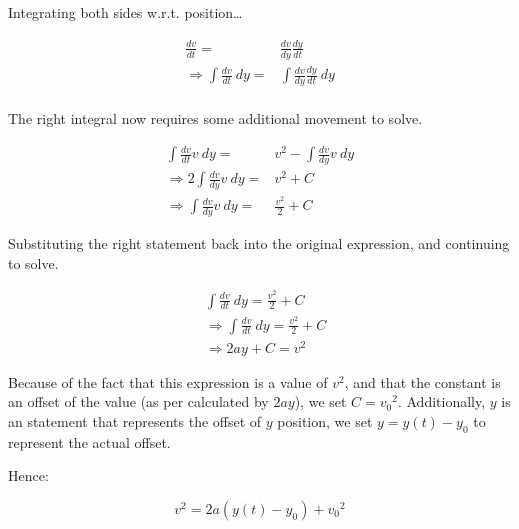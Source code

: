 \documentclass[letterpaper]{article}
\begin{document}
Integrating both sides w.r.t. position\ldots{}

\begin{align}
    \frac{dv}{dt} =& \frac{dv}{dy}\frac{dy}{dt} \\
    \Rightarrow \int \frac{dv}{dt}\ dy =& \int \frac{dv}{dy}\frac{dy}{dt}\ dy\\
\end{align}

The right integral now requires some additional movement to solve.

\begin{align}
     \int \frac{dv}{dt}v\ dy =& v^2 - \int \frac{dv}{dy} v\ dy \\
     \Rightarrow 2\int \frac{dv}{dy}v\ dy =& v^2 + C \\
     \Rightarrow \int \frac{dv}{dy}v\ dy =& \frac{v^2}{2} + C
\end{align}

Substituting the right statement back into the original expression, and continuing to solve.

\begin{align}
    & \int \frac{dv}{dt}\ dy = \frac{v^2}{2} + C \\
    & \Rightarrow \int \frac{dv}{dt}\ dy = \frac{v^2}{2} + C\\
    & \Rightarrow 2ay + C = v^2 
\end{align}

Because of the fact that this expression is a value of \(v^2\), and that the constant is an offset of the value (as per calculated by \(2ay\)), we set \(C = {v_0}^2\). Additionally, \(y\) is an statement that represents the offset of \(y\) position, we set \(y = y(t)-y_0\) to represent the actual offset.

Hence:

\begin{equation}
    v^2 = 2a(y(t)-y_0) + {v_0}^2
\end{equation}
\end{document}
